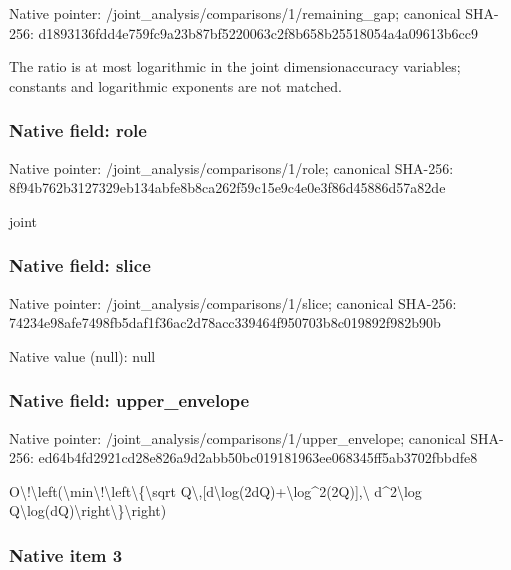 \documentclass[10pt,a4paper]{article}
\begin{document}
Native pointer: /joint\_analysis/comparis\allowbreak{}ons/1/remaining\_gap; canonical SHA-256: d1893136fdd4e759fc9a23b8\allowbreak{}7bf5220063c2f8b658b25518\allowbreak{}054a4a09613b6cc9


The ratio is at most logarithmic in the joint dimensionaccuracy variables; constants and logarithmic exponents are not matched.


\subsubsection{Native field: role}


Native pointer: /joint\_analysis/comparisons/1/role; canonical SHA-256: 8f94b762b3127329eb134abf\allowbreak{}e8b8ca262f59c15e9c4e0e3f\allowbreak{}86d45886d57a82de


joint


\subsubsection{Native field: slice}


Native pointer: /joint\_analysis/comparisons/1/slice; canonical SHA-256: 74234e98afe7498fb5daf1f3\allowbreak{}6ac2d78acc339464f950703b\allowbreak{}8c019892f982b90b



Native value (null): null



\subsubsection{Native field: upper\_envelope}


Native pointer: /joint\_analysis/comparis\allowbreak{}ons/1/upper\_envelope; canonical SHA-256: ed64b4fd2921cd28e826a9d2\allowbreak{}abb50bc019181963ee068345\allowbreak{}ff5ab3702fbbdfe8


O\textbackslash{}!\textbackslash{}left(\textbackslash{}min\textbackslash{}!\textbackslash{}left\textbackslash{}\{\textbackslash{}sqrt Q\textbackslash{},[d\textbackslash{}log(2dQ)+\textbackslash{}log\textasciicircum{}2(2Q)],\textbackslash{} d\textasciicircum{}2\textbackslash{}log Q\textbackslash{}log(dQ)\textbackslash{}right\textbackslash{}\}\textbackslash{}right)


\subsubsection{Native item 3}
\end{document}
